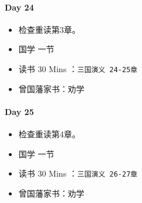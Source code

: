 \documentclass[UTF8,a4paper,8pt]{ctexart}
\begin{document}
 	 \paragraph{Day 24      \quad     }
	 	 \begin{itemize}[itemindent = 1em]
	 	 	\renewcommand\labelitemi{\makebox[0pt][l]{$\square$}\raisebox{.15ex}{\hspace{0.1em}$\checkmark$}}		
	 	 	
	 	 	\item    检查重读第3章。
	 	 	
	 	 	
	 	 	\renewcommand\labelitemi{\makebox[0pt][l]{$\square$}\hspace{1em}}
	 	 	\item   国学  一节
	 	 	\item   读书  30 Mins	：\verb|三国演义 24-25章|
	 	 	\item   曾国藩家书：劝学
	 	 \end{itemize}
 	 \paragraph{Day 25      \quad     }
	 	 \begin{itemize}[itemindent = 1em]
	 	 	\renewcommand\labelitemi{\makebox[0pt][l]{$\square$}\raisebox{.15ex}{\hspace{0.1em}$\checkmark$}}		
	 	 	
	 	 	\item    检查重读第4章。
	 	 	
	 	 	
	 	 	\renewcommand\labelitemi{\makebox[0pt][l]{$\square$}\hspace{1em}}
	 	 	\item   国学  一节
	 	 	\item   读书  30 Mins	：\verb|三国演义 26-27章|
	 	 	\item   曾国藩家书：劝学
	 	 \end{itemize}
\end{document}
